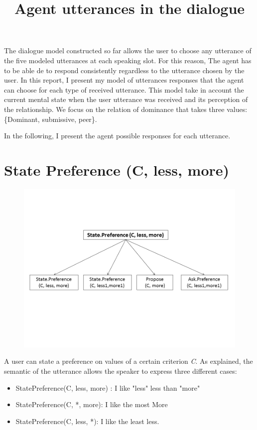 \documentclass{llncs}
\begin{document}
\title{Agent utterances in the dialogue}
\maketitle 

The dialogue model constructed so far allows the user to choose any utterance of the five modeled utterances at each speaking slot. For this reason, The agent has to be able de to respond consistently regardless to the utterance chosen by the user. In this report, I present my model of utterances responses that the agent can choose for each type of received utterance. This model take in account the current mental state when the user utterance was received and its perception of the relationship. We focus on the relation of dominance that takes three values: \{Dominant, submissive, peer\}.

\par In the following, I present the agent possible responses for each utterance. 
\section{State Preference (C, less, more)}
\begin{figure}[b]
	\centerline{\includegraphics[width=5in]{utterances/Diapositive2.PNG}}
	\vskip 8pt
\end{figure}

	\par A user can state a preference on values of a certain criterion \emph{C}. As explained, the semantic of the utterance allows the speaker to express three different cases:
	\begin{itemize}
		\item StatePreference(C, less, more) : I like "less" less than "more"
		\item StatePreference(C, *, more): I like the most More
		\item StatePreference(C, less, *): I like the least less. 
	\end{itemize}
	
\end{document}
